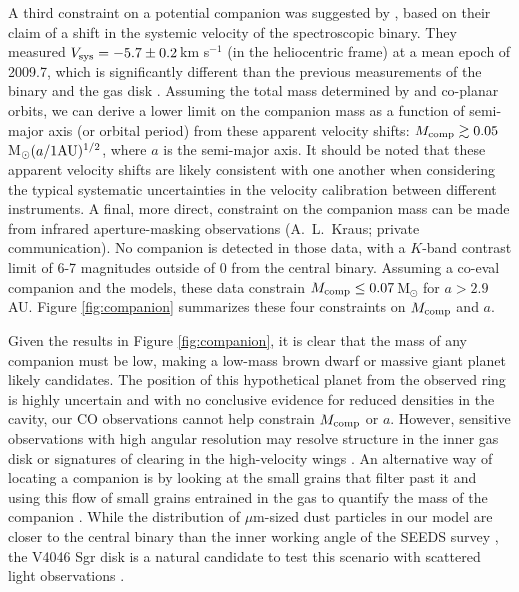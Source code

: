 {A third constraint on a potential companion was suggested by \citet{donati11}, 
based on their claim of a shift in the systemic velocity of the spectroscopic 
binary.  They measured $V_{\rm sys}=-5.7\pm0.2$\,km s$^{-1}$ (in the 
heliocentric frame) at a mean epoch of 2009.7, which is significantly different
than the previous measurements of the binary \citep[$-6.94\pm0.01$\,km 
s$^{-1}$ at epoch 1985.5;][]{quast00} and the gas disk 
\citep[$-6.26\pm.05$\,km s$^{-1}$;][]{rodriguez10}.  Assuming the total mass 
determined by \citet{rosenfeld12} and co-planar orbits, we can derive a lower 
limit on the companion mass as a function of semi-major axis (or orbital period)
from these apparent velocity shifts: $M_{\rm comp} \gtrsim 0.05$\,M$_\odot 
(a/{\rm 1AU})^{1/2}$, where $a$ is the semi-major axis.  It should be 
noted that these apparent velocity shifts are likely consistent with one another
when considering the typical systematic uncertainties in the velocity
calibration between different instruments.  A final, more direct, constraint on
the companion mass can be made from infrared aperture-masking observations 
(A.~L.~Kraus; private communication). No companion is detected in those data, 
with a $K$-band contrast limit of 6-7 magnitudes outside of 0 from the 
central binary.  Assuming a co-eval companion and the \citet{baraffe98} models,
these data constrain $M_{\rm comp} \le 0.07$\,M$_\odot$ for $a>2.9$\,AU.  
Figure \ref{fig:companion} summarizes these four constraints on $M_{\rm comp}$ 
and $a$.

Given the results in Figure \ref{fig:companion}, it is clear that the mass of 
any companion must be low, making a low-mass brown dwarf or massive giant planet
likely candidates.  The position of this hypothetical planet from the observed 
ring is highly uncertain and with no conclusive evidence for reduced densities 
in the cavity, our CO observations cannot help constrain $M_{\rm comp}$ or $a$. 
However, sensitive observations with high angular resolution may resolve 
structure in the inner gas disk \citep{casassus13} or signatures of clearing in 
the high-velocity wings \citep{dutrey08}.  An alternative way of
locating a companion is by looking at the small grains that filter past it 
and using this flow of small grains entrained in the gas to quantify the mass of
the companion \citep{rice06,zhu12}.  While the distribution of $\mu$m-sized dust
particles in our model are closer to the central binary than the inner working
angle of the SEEDS survey \citep[0-0]{tamura09},
the V4046 Sgr disk is a natural candidate to test this scenario with scattered 
light observations \citep[e.g.][]{dong12}.

}
